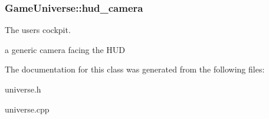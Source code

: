 \subsubsection[{\texorpdfstring{hud\+\_\+camera}{hud_camera}}]{ Game\+Universe\+::hud\+\_\+camera\hspace{0.3cm}{\ttfamily [protected]}}\hypertarget{classGameUniverse_a54f0e74750ae6274f4f759c8bce9c097}{}\label{classGameUniverse_a54f0e74750ae6274f4f759c8bce9c097}


The users cockpit. 

a generic camera facing the H\+UD 

The documentation for this class was generated from the following files\+:\begin{DoxyCompactItemize}
\item 
universe.\+h\item 
universe.\+cpp\end{DoxyCompactItemize}
